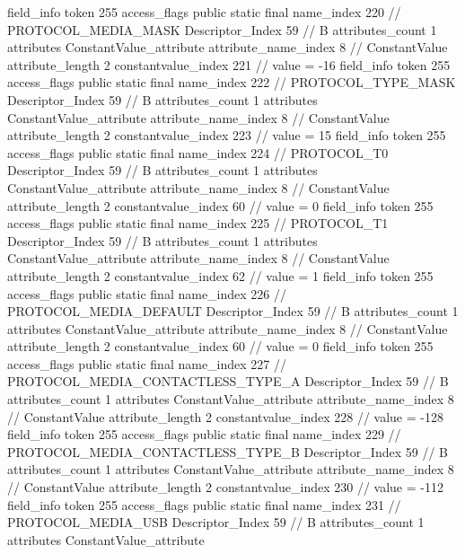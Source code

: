 {{{{{			}
			field_info {
				token	255
				access_flags	public static final
				name_index	220		// PROTOCOL_MEDIA_MASK
				Descriptor_Index	59		// B
				attributes_count	1
				attributes {
				ConstantValue_attribute {
					attribute_name_index	8		// ConstantValue
					attribute_length	2
					constantvalue_index	221		// value = -16
				}
				}
			}
			field_info {
				token	255
				access_flags	public static final
				name_index	222		// PROTOCOL_TYPE_MASK
				Descriptor_Index	59		// B
				attributes_count	1
				attributes {
				ConstantValue_attribute {
					attribute_name_index	8		// ConstantValue
					attribute_length	2
					constantvalue_index	223		// value = 15
				}
				}
			}
			field_info {
				token	255
				access_flags	public static final
				name_index	224		// PROTOCOL_T0
				Descriptor_Index	59		// B
				attributes_count	1
				attributes {
				ConstantValue_attribute {
					attribute_name_index	8		// ConstantValue
					attribute_length	2
					constantvalue_index	60		// value = 0
				}
				}
			}
			field_info {
				token	255
				access_flags	public static final
				name_index	225		// PROTOCOL_T1
				Descriptor_Index	59		// B
				attributes_count	1
				attributes {
				ConstantValue_attribute {
					attribute_name_index	8		// ConstantValue
					attribute_length	2
					constantvalue_index	62		// value = 1
				}
				}
			}
			field_info {
				token	255
				access_flags	public static final
				name_index	226		// PROTOCOL_MEDIA_DEFAULT
				Descriptor_Index	59		// B
				attributes_count	1
				attributes {
				ConstantValue_attribute {
					attribute_name_index	8		// ConstantValue
					attribute_length	2
					constantvalue_index	60		// value = 0
				}
				}
			}
			field_info {
				token	255
				access_flags	public static final
				name_index	227		// PROTOCOL_MEDIA_CONTACTLESS_TYPE_A
				Descriptor_Index	59		// B
				attributes_count	1
				attributes {
				ConstantValue_attribute {
					attribute_name_index	8		// ConstantValue
					attribute_length	2
					constantvalue_index	228		// value = -128
				}
				}
			}
			field_info {
				token	255
				access_flags	public static final
				name_index	229		// PROTOCOL_MEDIA_CONTACTLESS_TYPE_B
				Descriptor_Index	59		// B
				attributes_count	1
				attributes {
				ConstantValue_attribute {
					attribute_name_index	8		// ConstantValue
					attribute_length	2
					constantvalue_index	230		// value = -112
				}
				}
			}
			field_info {
				token	255
				access_flags	public static final
				name_index	231		// PROTOCOL_MEDIA_USB
				Descriptor_Index	59		// B
				attributes_count	1
				attributes {
				ConstantValue_attribute {
}}}}}}}
